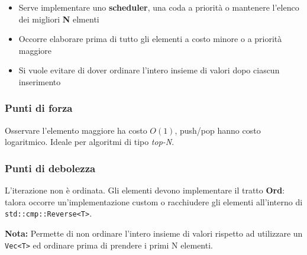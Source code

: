 \begin{itemize}
  \item Serve implementare uno \textbf{scheduler}, una coda a priorità o mantenere l'elenco dei migliori \textbf{N} elmenti
  \item Occorre elaborare prima di tutto gli elementi a costo minore o a priorità maggiore
  \item Si vuole evitare di dover ordinare l'intero insieme di valori dopo ciascun inserimento
\end{itemize}


\subsubsection{Punti di forza}
Osservare l'elemento maggiore ha costo $O(1)$, push/pop hanno costo logaritmico.
Ideale per algoritmi di tipo \textit{top-N}.

\subsubsection{Punti di debolezza}

L'iterazione non è ordinata. Gli elementi devono implementare il tratto \textbf{Ord}: talora occorre un'implementazione custom o
racchiudere gli elementi all'interno di \verb|std::cmp::Reverse<T>|.

\begin{tcolorbox}
  \textbf{Nota:} Permette di non ordinare l'intero insieme di valori rispetto ad
  utilizzare un \texttt{Vec<T>} ed ordinare prima di prendere i primi N elementi.
\end{tcolorbox}









